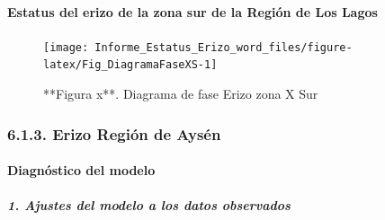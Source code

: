 \documentclass[
]{article}
\begin{document}
\hypertarget{estatus-del-erizo-de-la-zona-sur-de-la-regiuxf3n-de-los-lagos}{%
\paragraph{Estatus del erizo de la zona sur de la Región de Los
Lagos}\label{estatus-del-erizo-de-la-zona-sur-de-la-regiuxf3n-de-los-lagos}}

\begin{figure}

{\centering \texttt{[image: Informe\_Estatus\_Erizo\_word\_files/figure-latex/Fig\_DiagramaFaseXS-1]} 

}

\caption{**Figura x**. Diagrama de fase Erizo zona X Sur}\label{fig:Fig_DiagramaFaseXS}
\end{figure}

\hypertarget{erizo-regiuxf3n-de-aysuxe9n}{%
\subsubsection{6.1.3. Erizo Región de
Aysén}\label{erizo-regiuxf3n-de-aysuxe9n}}

\hypertarget{diagnuxf3stico-del-modelo-3}{%
\paragraph{Diagnóstico del modelo}\label{diagnuxf3stico-del-modelo-3}}

\hypertarget{ajustes-del-modelo-a-los-datos-observados-2}{%
\subparagraph{\texorpdfstring{\textbf{\emph{1. Ajustes del modelo a los
datos
observados}}}{1. Ajustes del modelo a los datos observados}}\label{ajustes-del-modelo-a-los-datos-observados-2}}
\end{document}

